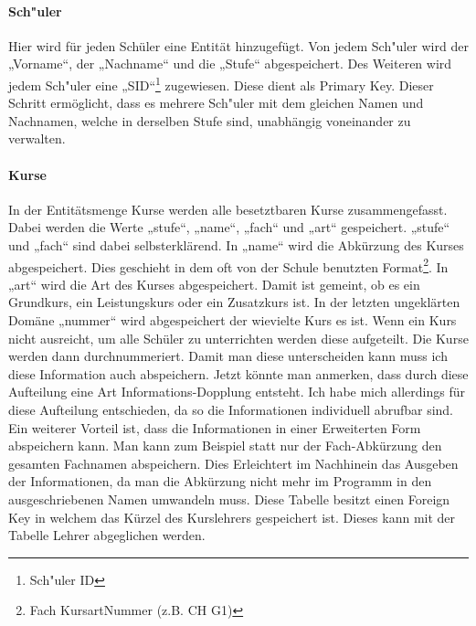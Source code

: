 \documentclass[a4paper, 12pt]{article}
\theoremstyle{plain}
\theoremstyle{definition}
\begin{document}
\paragraph{Sch"uler}Hier wird für jeden Schüler eine Entität hinzugefügt. Von jedem Sch"uler wird der „Vorname“, der „Nachname“ und die „Stufe“ abgespeichert. Des Weiteren wird jedem Sch"uler eine „SID“\footnote{Sch"uler ID} zugewiesen. Diese dient als Primary Key. Dieser Schritt ermöglicht, dass es mehrere Sch"uler mit dem gleichen Namen und Nachnamen, welche in derselben Stufe sind, unabhängig voneinander zu verwalten.

\paragraph{Kurse} In der Entitätsmenge Kurse werden alle besetztbaren Kurse zusammengefasst. Dabei werden die Werte „stufe“, „name“, „fach“ und „art“ gespeichert. „stufe“ und „fach“ sind dabei selbsterklärend. In „name“ wird die Abkürzung des Kurses abgespeichert. Dies geschieht in dem oft von der Schule benutzten Format\footnote{Fach KursartNummer (z.B. CH G1)}. In „art“ wird die Art des Kurses abgespeichert. Damit ist gemeint, ob es ein Grundkurs, ein Leistungskurs oder ein Zusatzkurs ist. In der letzten ungeklärten Domäne „nummer“ wird abgespeichert der wievielte Kurs es ist. Wenn ein Kurs nicht ausreicht, um alle Schüler zu unterrichten werden diese aufgeteilt. Die Kurse werden dann durchnummeriert. Damit man diese unterscheiden kann muss ich diese Information auch abspeichern. Jetzt könnte man anmerken, dass durch diese Aufteilung eine Art Informations-Dopplung entsteht. Ich habe mich allerdings für diese Aufteilung entschieden, da so die Informationen individuell abrufbar sind. Ein weiterer Vorteil ist, dass die Informationen in einer Erweiterten Form abspeichern kann. Man kann zum Beispiel statt nur der Fach-Abkürzung den gesamten Fachnamen abspeichern. Dies Erleichtert im Nachhinein das Ausgeben der Informationen, da man die Abkürzung nicht mehr im Programm in den ausgeschriebenen Namen umwandeln muss. Diese Tabelle besitzt einen Foreign Key in welchem das Kürzel des Kurslehrers gespeichert ist. Dieses kann mit der Tabelle Lehrer abgeglichen werden.

\end{document}
